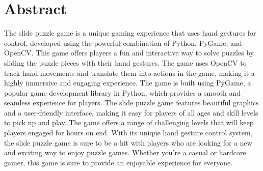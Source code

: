 \documentclass[11pt]{report}
\begin{document}
\maketitle

\chapter*{Abstract}
 The slide puzzle game is a unique gaming experience that uses hand gestures for control, developed using the powerful combination of Python, PyGame, and OpenCV. This game offers players a fun and interactive way to solve puzzles by sliding the puzzle pieces with their hand gestures. The game uses OpenCV to track hand movements and translate them into actions in the game, making it a highly immersive and engaging experience. The game is built using PyGame, a popular game development library in Python, which provides a smooth and seamless experience for players. The slide puzzle game features beautiful graphics and a user-friendly interface, making it easy for players of all ages and skill levels to pick up and play. The game offers a range of challenging levels that will keep players engaged for hours on end. With its unique hand gesture control system, the slide puzzle game is sure to be a hit with players who are looking for a new and exciting way to enjoy puzzle games. Whether you're a casual or hardcore gamer, this game is sure to provide an enjoyable experience for everyone.

\tableofcontents

\newpage
\setcounter{page}{0}

 
 
 
 
\renewcommand\bibname{References}
\printbibliography

\end{document}
